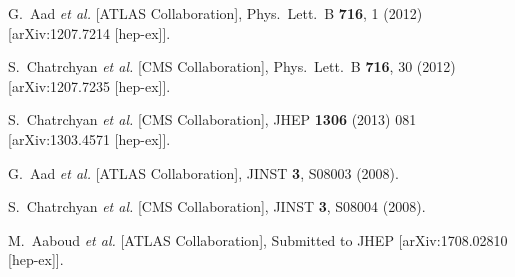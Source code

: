 \documentclass[10pt]{article}
\begin{document}
\begin{thebibliography}{99}



  G.~Aad {\it et al.}  [ATLAS Collaboration],
  Phys.\ Lett.\ B {\bf 716}, 1 (2012)
  [arXiv:1207.7214 [hep-ex]].
  
  
  S.~Chatrchyan {\it et al.}  [CMS Collaboration],
  Phys.\ Lett.\ B {\bf 716}, 30 (2012)
  [arXiv:1207.7235 [hep-ex]].


  S.~Chatrchyan {\it et al.} [CMS Collaboration],
  JHEP {\bf 1306} (2013) 081
  [arXiv:1303.4571 [hep-ex]].


  G.~Aad {\it et al.} [ATLAS Collaboration],
  JINST {\bf 3}, S08003 (2008).


  S.~Chatrchyan {\it et al.} [CMS Collaboration],
  JINST {\bf 3}, S08004 (2008).


  M.~Aaboud {\it et al.} [ATLAS Collaboration],
  Submitted to JHEP
  [arXiv:1708.02810 [hep-ex]].



\end{thebibliography}
\end{document}
